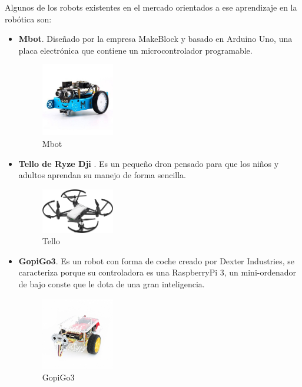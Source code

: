 \documentclass{report}
\begin{document}
Algunos de los robots existentes en el mercado orientados a ese aprendizaje en la robótica son:
\begin{itemize}
	\item \textbf{Mbot}. Diseñado por la empresa MakeBlock y basado en Arduino Uno, una placa electrónica que contiene un microcontrolador programable.
		\begin{figure}[h!]
  			\centering
   			 \includegraphics[width=0.3\textwidth]{images/mbot.png}
 			 \caption{Mbot}
 			 \label{Mbot}
		\end{figure}
	\item \textbf{Tello de Ryze Dji }. Es un pequeño dron pensado para que los niños y adultos aprendan su manejo de forma sencilla.
		\begin{figure}[h!]
  			\centering
   			 \includegraphics[width=0.3\textwidth]{images/tello.png}
 			 \caption{Tello}
 			 \label{Tello}
		\end{figure}
	\item \textbf{GopiGo3}. Es un robot con forma de coche creado por Dexter Industries, se caracteriza porque su controladora es una RaspberryPi 3, un mini-ordenador de bajo conste que le dota de una gran inteligencia.
		\begin{figure}[h!]
  			\centering
   			 \includegraphics[width=0.3\textwidth]{images/gopigo.png}
 			 \caption{GopiGo3}
 			 \label{GopiGo3}
		\end{figure}
\end{itemize}
\end{document}
